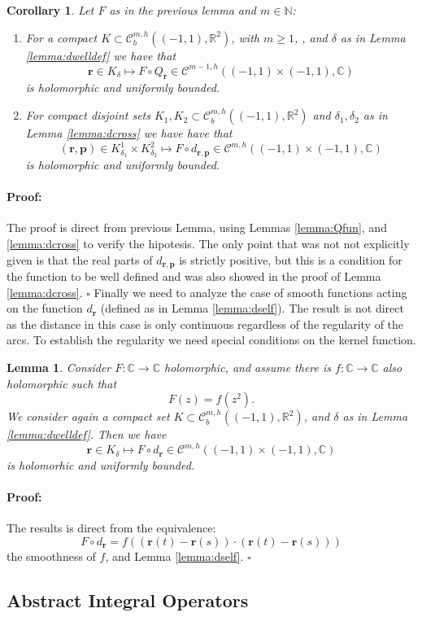 \documentclass{article}
\newtheorem{lemma}[theorem]{Lemma}
\newtheorem{corollary}[theorem]{Corollary}
\newenvironment{proof}{\paragraph{Proof:}}{\hfill$\square$}
\newcommand{\IC}{{\mathbb C}}
\newcommand{\IN}{{\mathbb N}}
\newcommand{\IR}{{\mathbb R}}
\newcommand{\bp}{{\bm p}}
\newcommand{\cmspaceh}[4]{\mathcal{C}^{#1,#2} \left( #3, #4 \right)}
\newcommand{\rgeoh}[2]{\mathcal{C}_b^{#1,#2}\left( (-1,1), \IR^2 \right)}
\newcommand{\br}{\bm{r}}
\begin{document}
\begin{corollary}
\label{cor:smoothcomp}
Let $F$ as in the previous lemma and $m \in \IN$: 
\begin{enumerate}
\item 
For a compact $K \subset \rgeoh{m}{h}$, with $m \geq 1$, , and $\delta$ as in Lemma \ref{lemma:dwelldef} we have that 
$$\br \in K_\delta \mapsto F \circ Q_{\br} \in \cmspaceh{m-1}{h}{(-1,1)\times(-1,1)}{\IC}$$
is holomorphic and uniformly bounded. 
\item 
For compact disjoint sets $K_1,K_2 \subset  \rgeoh{m}{h}$ and $\delta_1, \delta_2$ as in Lemma \ref{lemma:dcross} we have have that 
$$(\br,\bp) \in K^1_{\delta_1} \times K^2_{\delta_2} \mapsto F \circ d_{\br,\bp} \in \cmspaceh{m}{h}{(-1,1)\times(-1,1)}{\IC}$$
is holomorphic and uniformly bounded.
\end{enumerate}
\end{corollary}
\begin{proof}
The proof is direct from previous Lemma, using Lemmas \ref{lemma:Qfun}, and \ref{lemma:dcross} to verify the hipotesis. The only point that was not not explicitly given is that the real parts of $d_{\br,\bp}$ is strictly positive, but this is a condition for the function to be well defined and was also showed in the proof of Lemma \ref{lemma:dcross}.
\end{proof}
Finally we need to analyze the case of smooth functions acting on the function $d_{\br}$ (defined as in Lemma \ref{lemma:dself}). The result is not direct as the distance in this case is only continuous regardless of the regularity of the arcs. To establish the regularity we need special conditions on the kernel function. 
\begin{lemma}
\label{lemma:selfkernell}
Consider $F :\IC \rightarrow \IC$ holomorphic, and assume there is $f : \IC \rightarrow \IC$ also holomorphic such that
$$F(z) = f(z^2).$$ 
We consider again a compact set $K \subset \rgeoh{m}{h}$, and $\delta$ as in Lemma \ref{lemma:dwelldef}. Then we have 
$$\br \in K_\delta \mapsto F\circ d_{\br} \in \cmspaceh{m}{h}{(-1,1)\times(-1,1)}{\IC}$$
is holomorhic and uniformly bounded. 
\end{lemma}
\begin{proof}
The results is direct from the equivalence: $$F\circ d_{\br} = f( (\br(t)-\br(s)) \cdot (\br(t)-\br(s)))$$ the smoothness of $f$, and Lemma \ref{lemma:dself}. 
\end{proof}

\subsection{Abstract Integral Operators}
\end{document}
